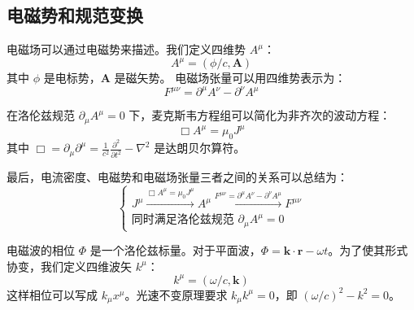 \documentclass[fontset=none]{ctexart}
\begin{document}
\subsection{电磁势和规范变换}
\begin{definition}[四维势]
电磁场可以通过电磁势来描述。我们定义四维势 $A^{\mu}$：
\begin{equation}
A^{\mu} = (\phi/c, \bm{A})
\end{equation}
其中 $\phi$ 是电标势，$\bm{A}$ 是磁矢势。
电磁场张量可以用四维势表示为：
\begin{equation}
F^{\mu\nu} = \partial^{\mu}A^{\nu} - \partial^{\nu}A^{\mu}
\end{equation}
\end{definition}
在洛伦兹规范 $\partial_{\mu}A^{\mu} = 0$ 下，麦克斯韦方程组可以简化为非齐次的波动方程：
\begin{equation}
\Box A^{\mu} = \mu_0 J^{\mu}
\end{equation}
其中 $\Box = \partial_{\mu}\partial^{\mu} = \frac{1}{c^2}\frac{\partial^2}{\partial t^2} - \nabla^2$ 是达朗贝尔算符。

最后，电流密度、电磁势和电磁场张量三者之间的关系可以总结为：
\begin{equation}
\begin{cases}
J^{\mu} \xrightarrow{\Box A^{\mu} = \mu_0 J^{\mu}} A^{\mu} \xrightarrow{F^{\mu\nu} = \partial^{\mu}A^{\nu} - \partial^{\nu}A^{\mu}} F^{\mu\nu} \\
\text{同时满足洛伦兹规范 } \partial_{\mu}A^{\mu} = 0
\end{cases}
\end{equation}

\begin{definition}[四维波矢]
电磁波的相位 $\Phi$ 是一个洛伦兹标量。对于平面波，$\Phi = \bm{k}\cdot\bm{r} - \omega t$。为了使其形式协变，我们定义四维波矢 $k^{\mu}$：
\begin{equation}
k^{\mu} = (\omega/c, \bm{k})
\end{equation}
这样相位可以写成 $k_{\mu}x^{\mu}$。光速不变原理要求 $k_{\mu}k^{\mu} = 0$，即 $(\omega/c)^2 - k^2 = 0$。
\end{definition}
\end{document}
